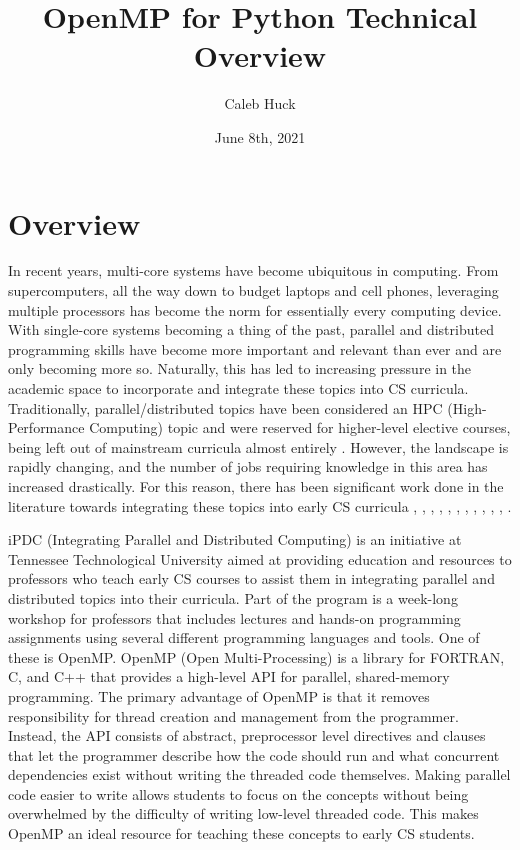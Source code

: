 \documentclass[letterpaper,12pt]{article} %
\begin{document}
\title{\Large{\textbf{OpenMP for Python Technical Overview}}}
\author{Caleb Huck}
\date{June 8th, 2021}
\maketitle

\section{Overview}
In recent years, multi-core systems have become ubiquitous in computing. From supercomputers, all the way down to budget laptops and cell phones, leveraging multiple processors has become the norm for essentially every computing device. With single-core systems becoming a thing of the past, parallel and distributed programming skills have become more important and relevant than ever and are only becoming more so. Naturally, this has led to increasing  pressure in the academic space to incorporate and integrate these topics into CS curricula. Traditionally, parallel/distributed topics have been considered an HPC (High-Performance Computing) topic and were reserved for higher-level elective courses, being left out of mainstream curricula almost entirely \cite{ernst2008concurrent}. However, the landscape is rapidly changing, and the number of jobs requiring knowledge in this area has increased drastically. For this reason, there has been significant work done in the literature towards integrating these topics into early CS curricula \cite{ko2013parallel}, \cite{adams2014injecting}, \cite{neelima2015introducing}, \cite{graham2007integrating}, \cite{brown2012csinparallel}, \cite{brown2011modules}, \cite{adams2013patterns}, \cite{ernst2008concurrent}, \cite{ahmed2013introducing}, \cite{bogaerts2014limited}, \cite{kurtz1998parallel}, \cite{luintegrating}. 

iPDC (Integrating Parallel and Distributed Computing) \cite{ipdc} is an initiative at Tennessee Technological University aimed at providing education and resources to professors who teach early CS courses to assist them in integrating parallel and distributed topics into their curricula. Part of the program is a week-long workshop for professors that includes lectures and hands-on programming assignments using several different programming languages and tools. One of these is OpenMP. OpenMP (Open Multi-Processing) is a library for FORTRAN, C, and C++ that provides a high-level API for parallel, shared-memory programming. The primary advantage of OpenMP is that it removes responsibility for thread creation and management from the programmer. Instead, the API consists of abstract, preprocessor level directives and clauses that let the programmer describe how the code should run and what concurrent dependencies exist without writing the threaded code themselves. Making parallel code easier to write allows students to focus on the concepts without being overwhelmed by the difficulty of writing low-level threaded code. This makes OpenMP an ideal resource for teaching these concepts to early CS students. 
\end{document}
